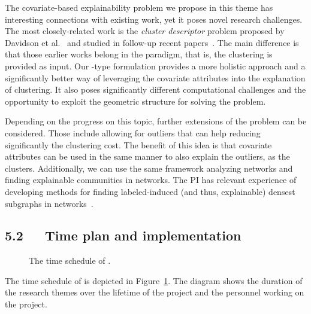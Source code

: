 \documentclass[a4paper,11pt]{article}
\begin{document}
The covariate-based explainability problem we propose in this theme
has interesting connections with existing work, yet it poses novel research challenges.
The most closely-related work is the \emph{cluster descriptor} problem
proposed by Davidson et al.~\cite{davidson2018cluster} 
and studied in follow-up recent papers~\citep{sambaturu2020efficient}.
The main difference is that those earlier works belong in the \posthoc paradigm, 
that is, the clustering is provided as input. 
Our \joint-type formulation provides a more holistic approach and a
significantly better way of leveraging the covariate attributes into the explanation of clustering. 
It also poses significantly different computational challenges
and the opportunity to exploit the geometric structure for solving the problem.

Depending on the progress on this topic, further extensions of the problem can be considered. 
Those include allowing for outliers that can help reducing significantly the clustering cost.
The benefit of this idea is that covariate attributes can be used in the same manner
to also explain the outliers, as the clusters.
Additionally, we can use the same framework analyzing networks and finding 
explainable communities in networks.
The PI has relevant experience of developing methods for finding labeled-induced
(and thus, explainable) densest subgraphs in networks~\cite{galbrun2014overlapping}.

\subsection*{5.2~~~Time plan and implementation}


\begin{figure}[t]
\begin{center}
\vspace{-2mm}
{\small}
\end{center}
\vspace{-6mm}
\caption{\label{figure:gantt}The time schedule of {\acronym}.}
\vspace{-2mm}
\end{figure}

The time schedule of \acronym is depicted in Figure~\ref{figure:gantt}. 
The diagram shows the duration of the research themes over the lifetime of the project
and the personnel working on the project.
\end{document}
